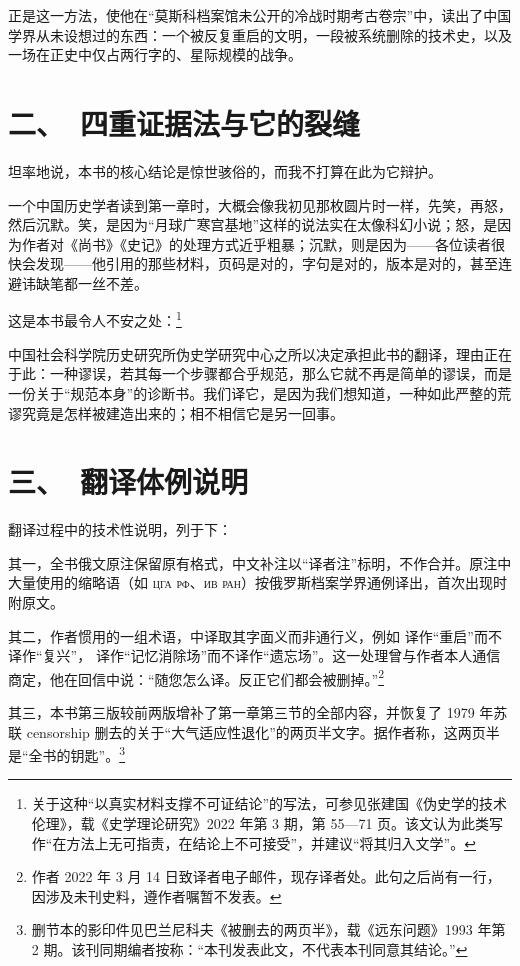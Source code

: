 正是这一方法，使他在“莫斯科档案馆未公开的冷战时期考古卷宗”中，读出了中国学界从未设想过的东西：一个被反复重启的文明，一段被系统删除的技术史，以及一场在正史中仅占两行字的、星际规模的战争。

\section*{二、\ 四重证据法与它的裂缝}

坦率地说，本书的核心结论是惊世骇俗的，而我不打算在此为它辩护。

一个中国历史学者读到第一章时，大概会像我初见那枚圆片时一样，先笑，再怒，然后沉默。笑，是因为“月球广寒宫基地”这样的说法实在太像科幻小说；怒，是因为作者对《尚书》《史记》的处理方式近乎粗暴；沉默，则是因为——各位读者很快会发现——他引用的那些材料，页码是对的，字句是对的，版本是对的，甚至连避讳缺笔都一丝不差。

这是本书最令人不安之处：\footnote{关于这种“以真实材料支撑不可证结论”的写法，可参见张建国《伪史学的技术伦理》，载《史学理论研究》2022 年第 3 期，第 55—71 页。该文认为此类写作“在方法上无可指责，在结论上不可接受”，并建议“将其归入文学”。}

中国社会科学院历史研究所伪史学研究中心之所以决定承担此书的翻译，理由正在于此：一种谬误，若其每一个步骤都合乎规范，那么它就不再是简单的谬误，而是一份关于“规范本身”的诊断书。我们译它，是因为我们想知道，一种如此严整的荒谬究竟是怎样被建造出来的；相不相信它是另一回事。

\section*{三、\ 翻译体例说明}

翻译过程中的技术性说明，列于下：

其一，全书俄文原注保留原有格式，中文补注以“译者注”标明，不作合并。原注中大量使用的缩略语（如 \textsc{цга рф}、\textsc{ив ран}）按俄罗斯档案学界通例译出，首次出现时附原文。

其二，作者惯用的一组术语，中译取其字面义而非通行义，例如  译作“重启”而不译作“复兴”， 译作“记忆消除场”而不译作“遗忘场”。这一处理曾与作者本人通信商定，他在回信中说：“随您怎么译。反正它们都会被删掉。”\footnote{作者 2022 年 3 月 14 日致译者电子邮件，现存译者处。此句之后尚有一行，因涉及未刊史料，遵作者嘱暂不发表。}

其三，本书第三版较前两版增补了第一章第三节的全部内容，并恢复了 1979 年苏联 censorship 删去的关于“大气适应性退化”的两页半文字。据作者称，这两页半是“全书的钥匙”。\footnote{删节本的影印件见巴兰尼科夫《被删去的两页半》，载《远东问题》1993 年第 2 期。该刊同期编者按称：“本刊发表此文，不代表本刊同意其结论。”}

